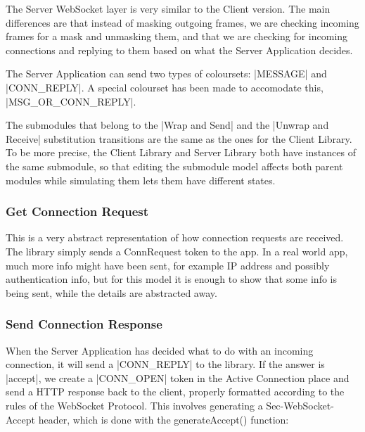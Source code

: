 	
	The Server WebSocket layer is very similar to the Client version. The main
	differences are that instead of masking outgoing frames, we are checking
	incoming frames for a mask and unmasking them, and that we are checking for
	incoming connections and replying to them based on what the Server Application
	decides.
	
	The Server Application can send two types of coloursets: |MESSAGE| and
	|CONN_REPLY|. A special colourset has been made to accomodate this,
	|MSG_OR_CONN_REPLY|. 
	
	The submodules that belong to the |Wrap and Send| and the
	|Unwrap and Receive| substitution transitions are the same as the ones for the Client Library. To
	be more precise, the Client Library and Server Library both have instances of
	the same submodule, so that editing the submodule model affects both parent
	modules while simulating them lets them have different states.
	
	\subsubsection{Get Connection Request}
		
		
		This is a very abstract representation of how connection requests are
		received. The library simply sends a ConnRequest token to the app. In a real
		world app, much more info might have been sent, for example IP address and
		possibly authentication info, but for this model it is enough to show that
		some info is being sent, while the details are abstracted away. 

	\subsubsection{Send Connection Response}
		
		
		When the Server Application has decided what to do with an incoming
		connection, it will send a |CONN_REPLY| to the library. If the
		answer is |accept|, we create a |CONN_OPEN| token in the
		Active Connection place and send a HTTP response back to the client, properly
		formatted according to the rules of the WebSocket Protocol. This involves
		generating a Sec-WebSocket-Accept header, which is done with the
		generateAccept() function:
		
